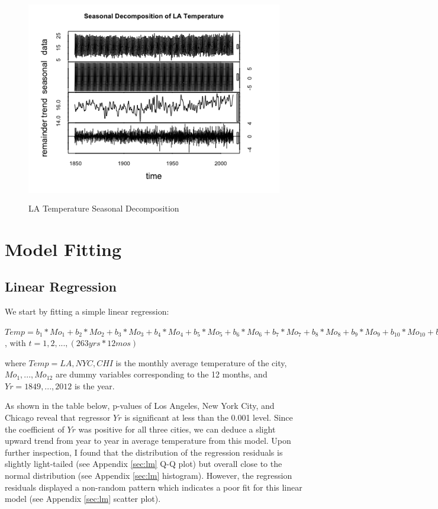 \documentclass[12pt]{article}
\begin{document}
\begin{figure}[H]
    \centering
    \includegraphics[width=\textwidth, height=9cm]{Figures/laSea.png}
    \caption{LA Temperature Seasonal Decomposition}
    \label{fig:laSea}
\end{figure}




\section{Model Fitting}
\subsection{Linear Regression}
We start by fitting a simple linear regression: 

\vspace{0.2cm}
\noindent $Temp = b_1*Mo_1 + b_2*Mo_2 + b_3*Mo_3 + b_4*Mo_4 + b_5*Mo_5 + b_6*Mo_6 + b_7*Mo_7 + b_8*Mo_8 + b_9*Mo_9 + b_{10}*Mo_{10} + b_{11}*Mo_{11} + b_{12}*Mo_{12} + b_{13}*Yr$, with $t = 1, 2, ..., (263 yrs * 12 mos)$ 

\vspace{0.2cm}
\noindent where $Temp = LA, NYC, CHI$ is the monthly average temperature of the city, $Mo_1, ... , Mo_{12}$ are dummy variables corresponding to the 12 months, and $Yr = 1849, ..., 2012$ is the year. 

\vspace{0.5cm}
\noindent As shown in the table below, p-values of Los Angeles, New York City, and Chicago reveal that regressor $Yr$ is significant at less than the 0.001 level. Since the coefficient of $Yr$ was positive for all three cities, we can deduce a slight upward trend from year to year in average temperature from this model. Upon further inspection, I found that the distribution of the regression residuals is slightly light-tailed (see Appendix \ref{sec:lm} Q-Q plot) but overall close to the normal distribution (see Appendix \ref{sec:lm} histogram). However, the regression residuals displayed a non-random pattern which indicates a poor fit for this linear model (see Appendix \ref{sec:lm} scatter plot).
\end{document}

